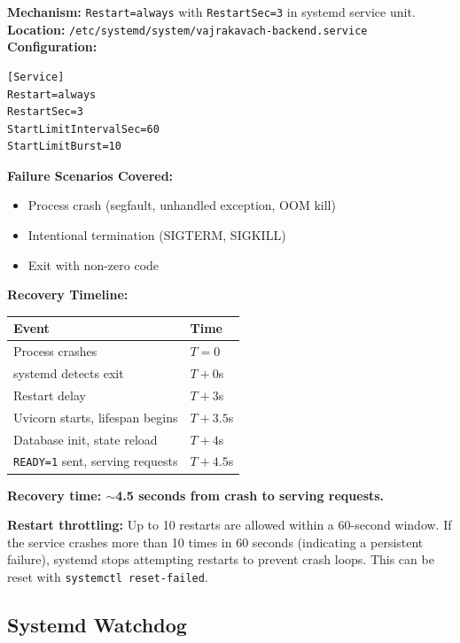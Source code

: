 \documentclass[11pt,a4paper]{article}
\begin{document}
\begin{tcolorbox}[colback=recoveryblue!5, colframe=recoveryblue]
\textbf{Mechanism:} \texttt{Restart=always} with \texttt{RestartSec=3} in systemd service unit.\\
\textbf{Location:} \texttt{/etc/systemd/system/vajrakavach-backend.service}\\
\textbf{Configuration:}
\begin{verbatim}
[Service]
Restart=always
RestartSec=3
StartLimitIntervalSec=60
StartLimitBurst=10
\end{verbatim}
\textbf{Failure Scenarios Covered:}
\begin{itemize}[nosep]
  \item Process crash (segfault, unhandled exception, OOM kill)
  \item Intentional termination (SIGTERM, SIGKILL)
  \item Exit with non-zero code
\end{itemize}
\textbf{Recovery Timeline:}
\begin{center}
\begin{tabular}{ll}
\toprule
\textbf{Event} & \textbf{Time} \\
\midrule
Process crashes & $T = 0$ \\
systemd detects exit & $T + 0$s \\
Restart delay & $T + 3$s \\
Uvicorn starts, lifespan begins & $T + 3.5$s \\
Database init, state reload & $T + 4$s \\
\texttt{READY=1} sent, serving requests & $T + 4.5$s \\
\bottomrule
\end{tabular}
\end{center}
\textbf{Recovery time: $\sim$4.5 seconds from crash to serving requests.}

\textbf{Restart throttling:} Up to 10 restarts are allowed within a 60-second window. If the service crashes more than 10 times in 60 seconds (indicating a persistent failure), systemd stops attempting restarts to prevent crash loops. This can be reset with \texttt{systemctl reset-failed}.
\end{tcolorbox}

\subsection{Systemd Watchdog}
\end{document}
